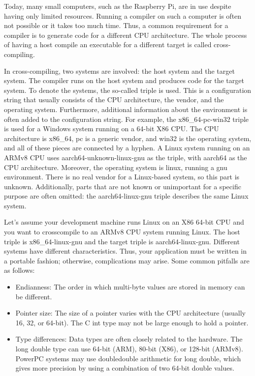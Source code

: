 Today, many small computers, such as the Raspberry Pi, are in use despite having only limited resources. Running a compiler on such a computer is often not possible or it takes too much time. Thus, a common requirement for a compiler is to generate code for a different CPU architecture. The whole process of having a host compile an executable for a different target is called cross-compiling.

In cross-compiling, two systems are involved: the host system and the target system. The compiler runs on the host system and produces code for the target system. To denote the systems, the so-called triple is used. This is a configuration string that usually consists of the CPU architecture, the vendor, and the operating system. Furthermore, additional information about the environment is often added to the configuration string. For example, the x86\_64-pc-win32 triple is used for a Windows system running on a 64-bit X86 CPU. The CPU architecture is x86\_64, pc is a generic vendor, and win32 is the operating system, and all of these pieces are connected by a hyphen. A Linux system running on an ARMv8 CPU uses aarch64-unknown-linux-gnu as the triple, with aarch64 as the CPU architecture. Moreover, the operating system is linux, running a gnu environment. There is no real vendor for a Linux-based system, so this part is unknown. Additionally, parts that are not known or unimportant for a specific purpose are often omitted: the aarch64-linux-gnu triple describes the same Linux system.

Let’s assume your development machine runs Linux on an X86 64-bit CPU and you want to crosscompile to an ARMv8 CPU system running Linux. The host triple is x86\_64-linux-gnu and the target triple is aarch64-linux-gnu. Different systems have different characteristics. Thus, your application must be written in a portable fashion; otherwise, complications may arise. Some common pitfalls are as follows:

\begin{itemize}
\item
Endianness: The order in which multi-byte values are stored in memory can be different.

\item
Pointer size: The size of a pointer varies with the CPU architecture (usually 16, 32, or 64-bit). The C int type may not be large enough to hold a pointer.

\item
Type differences: Data types are often closely related to the hardware. The long double type can use 64-bit (ARM), 80-bit (X86), or 128-bit (ARMv8). PowerPC systems may use doubledouble arithmetic for long double, which gives more precision by using a combination of two 64-bit double values.
\end{itemize}

